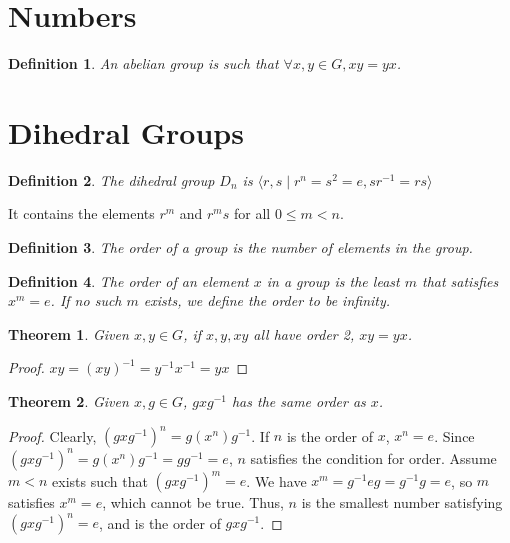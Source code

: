 \documentclass{article}
\newtheorem{theorem}{Theorem}[section]
\newtheorem{definition}{Definition}[section]
\begin{document}
\section{Numbers}

\begin{definition}
    An \emph{abelian} group is such that $\forall x,y \in G, xy = yx$.
\end{definition}

\section{Dihedral Groups}

\begin{definition}
    The dihedral group $D_n$ is 
    $\langle r,s \mid r^{n} = s^{2} = e, sr^{-1} = rs\rangle$
\end{definition}

It contains the elements $r^{m}$ and $r^{m}s$ for all $0 \le m < n$.

\begin{definition}
    The \emph{order} of a group is the number of elements in the group.
\end{definition}

\begin{definition}
    The \emph{order} of an element $x$ in a group is
    the least $m$ that satisfies $x^{m} = e$.
    If no such $m$ exists, we define the order to be infinity.
\end{definition}

\begin{theorem}
    Given $x,y \in G$, if $x,y,xy$ all have order 2, $xy = yx$.
\end{theorem}
\begin{proof}
    $xy = (xy)^{-1} = y^{-1}x^{-1} = yx$
\end{proof}

\begin{theorem}
    Given $x,g \in G$, $gxg^{-1}$ has the same order as $x$.
\end{theorem}
\begin{proof}
    Clearly, $(gxg^{-1})^{n} = g(x^{n})g^{-1}$.
    If $n$ is the order of $x$, $x^{n} = e$.
    Since $(gxg^{-1})^{n} = g(x^{n})g^{-1} = gg^{-1} = e$, $n$ satisfies the condition for order.
    Assume $m < n$ exists such that $(gxg^{-1})^{m} = e$.
    We have $x^{m} = g^{-1}eg = g^{-1}g = e$, so $m$ satisfies $x^{m} = e$, which cannot be true.
    Thus, $n$ is the smallest number satisfying $(gxg^{-1})^{n} = e$, and is the order of $gxg^{-1}$.
\end{proof}
\end{document}
